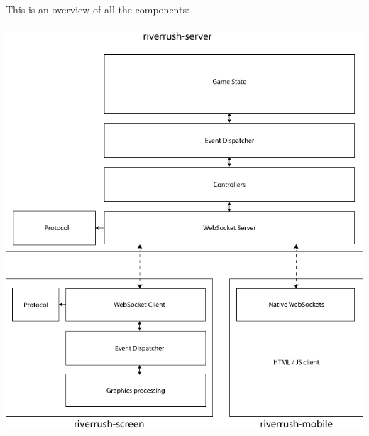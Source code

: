 \documentclass[11pt,a4paper]{article}
\begin{document}
This is an overview of all the components:\\
\\
\includegraphics[scale=0.6]{arch.png}
\end{document}
